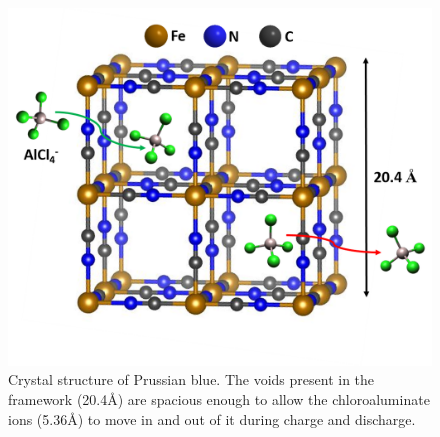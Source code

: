  \begin{figure}[th!]
  \centering
  \includegraphics[width=\textwidth]{Figures/chap6fig/pbcrys}
    \caption{Crystal structure of Prussian blue. The voids present in the framework (20.4\AA) are spacious enough to allow the chloroaluminate ions (5.36\AA) to move in and out of it during charge and discharge. }
  \label{Figures/chap6fig:pbcrys}
\end{figure}

